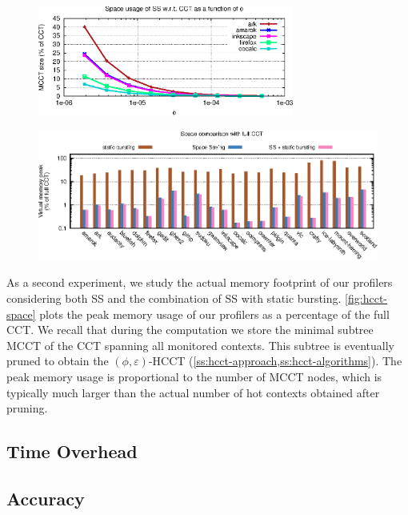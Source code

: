 \ifdefined\noauthorea
\begin{figure}[!ht]
\begin{center}
\includegraphics[width=0.75\textwidth]{figures/hcct-space-by-phi/hcct-space-by-phi.eps}
\caption{\protect}
\end{center}
\end{figure}
\fi

\ifdefined\noauthorea
\begin{figure}[!ht]
\begin{center}
\includegraphics[width=\textwidth]{figures/hcct-space/hcct-space.eps}
\caption{\protect}
\end{center}
\end{figure}
\fi

As a second experiment, we study the actual memory footprint of our profilers considering both SS and the combination of SS with static bursting. \myfigure\ref{fig:hcct-space} plots the peak memory usage of our profilers as a percentage of the full CCT. We recall that during the computation we store the minimal subtree MCCT of the CCT spanning all monitored contexts. This subtree is eventually pruned to obtain the $(\phi,\varepsilon)$-HCCT (\mysection\ref{ss:hcct-approach,ss:hcct-algorithms}). The peak memory usage is proportional to the number of MCCT nodes, which is typically much larger than the actual number of hot contexts obtained after pruning.

\subsection{Time Overhead}

\subsection{Accuracy}